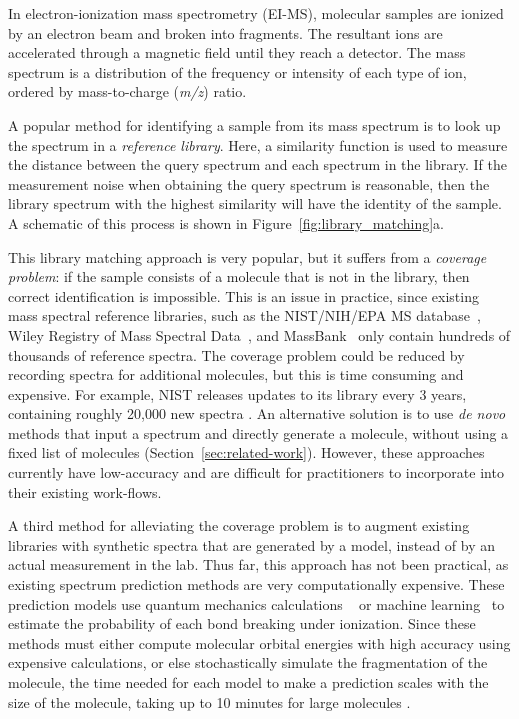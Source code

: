 \documentclass{article}
\begin{document}
In electron-ionization mass spectrometry (EI-MS), molecular samples are ionized by an electron beam and broken into fragments. The resultant ions are accelerated through a magnetic field until they reach a detector. The mass spectrum is a distribution of the frequency or intensity of each type of ion, ordered by mass-to-charge (\textit{m/z}) ratio.

A popular method for identifying a sample from its mass spectrum is to look up the spectrum in a \textit{reference library}. Here, a similarity function is used to measure the distance between the query spectrum and each spectrum in the library. If the measurement noise when obtaining the query spectrum is reasonable, then the library spectrum with the highest similarity will have the identity of the sample. A schematic of this process is shown in Figure~\ref{fig:library_matching}a.

This library matching approach is very popular, but it suffers from a \textit{coverage problem}: if the sample consists of a molecule that is not in the library, then correct identification is impossible. This is an issue in practice, since existing mass spectral reference libraries, such as the NIST/NIH/EPA MS database~\cite{2017nist}, Wiley Registry of Mass Spectral Data~\cite{mclafferty2016wiley}, and MassBank~\cite{horai2010massbank} only contain hundreds of thousands of reference spectra. The coverage problem could be reduced by recording spectra for additional molecules, but this is time consuming and expensive. For example, NIST releases updates to its library every 3 years, containing roughly 20,000 new spectra \cite{2017nist}. An alternative solution is to use \textit{de novo} methods that input a spectrum and directly generate a molecule, without using a fixed list of molecules (Section~\ref{sec:related-work}). However, these approaches currently have low-accuracy and are difficult for practitioners to incorporate into their existing work-flows. 

A third method for alleviating the coverage problem is to 
augment existing libraries with synthetic spectra that are generated by a model, instead of by an actual measurement in the lab. Thus far, this approach has not been practical, as existing spectrum prediction methods are very computationally expensive. These prediction models use quantum mechanics calculations ~\cite{bauer2016compute,grimme2013towards,Guerra_BEB_model} or machine learning~\cite{allen2016computational} to estimate the probability of each bond breaking under ionization. Since these methods must either compute molecular orbital energies with high accuracy using expensive calculations, or else stochastically simulate the fragmentation of the molecule, the time needed for each model to make a prediction scales with the size of the molecule, taking up to 10 minutes for large molecules \cite{allen2016computational}.
\end{document}
